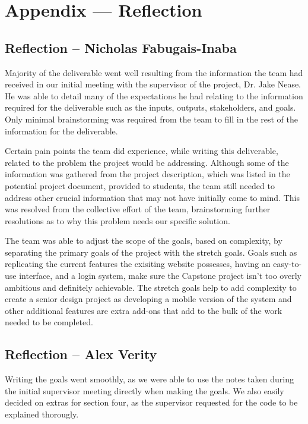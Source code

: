 \documentclass{article}
\begin{document}
\newpage{}

\section*{Appendix --- Reflection}

\subsection*{Reflection -- Nicholas Fabugais-Inaba}

Majority of the deliverable went well resulting from the information
the team had received in our initial meeting with the supervisor of the
project, Dr. Jake Nease. He was able to detail many of the expectations
he had relating to the information required for the deliverable such as
the inputs, outputs, stakeholders, and goals. Only minimal brainstorming
was required from the team to fill in the rest of the information for the
deliverable. \newline

Certain pain points the team did experience, while writing this deliverable,
related to the problem the project would be addressing. Although some of
the information was gathered from the project description, which was listed
in the potential project document, provided to students, the team
still needed to address other crucial information that may not have
initially come to mind. This was resolved from the collective effort of
the team, brainstorming further resolutions as to why this problem needs
our specific solution. \newline

The team was able to adjust the scope of the goals, based on complexity,
by separating the primary goals of the project with the stretch goals.
Goals such as replicating the current features the exisiting website
possesses, having an easy-to-use interface, and a login system, make sure
the Capstone project isn't too overly ambitious and definitely achievable.
The stretch goals help to add complexity to create a senior design project
as developing a mobile version of the system and other additional features
are extra add-ons that add to the bulk of the work needed to be completed.

\subsection*{Reflection -- Alex Verity}

Writing the goals went smoothly, as we were able to use the notes taken during
the initial supervisor meeting directly when making the goals. We also easily
decided on extras for section four, as the supervisor requested for the code
to be explained thorougly.\newline
\end{document}
